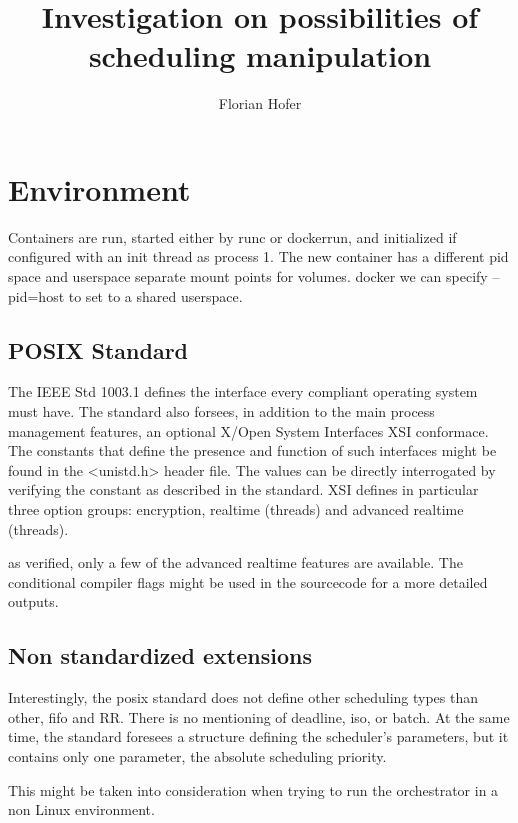 \documentclass[]{scrartcl}
\title{Investigation on possibilities of scheduling manipulation}
\author{Florian Hofer}
\begin{document}
\maketitle

%

\section{Environment}

Containers are run, started either by runc or dockerrun, and initialized if configured with an init thread as process 1. 
The new container has a different pid space and userspace
separate mount points for volumes. docker we can specify --pid=host to set to a shared userspace.

\subsection{POSIX Standard}

The IEEE Std 1003.1 defines the interface every compliant operating system must have. The standard also forsees, in addition to the main process management features, an optional X/Open System Interfaces XSI conformace.
The constants that define the presence and function of such interfaces might be found in the <unistd.h> header file. 
The values can be directly interrogated by verifying the constant as described in the standard.
XSI defines in particular three option groups: encryption, realtime (threads) and advanced realtime (threads). 

as verified, only a few of the advanced realtime features are available. 
The conditional compiler flags might be used in the sourcecode for a more detailed outputs. 

\subsection{Non standardized extensions}

Interestingly, the posix standard does not define other scheduling types than other, fifo and RR. 
There is no mentioning of deadline, iso, or batch. 
At the same time, the standard foresees a structure defining the scheduler's parameters, but it contains only one parameter, the absolute scheduling priority.

This might be taken into consideration when trying to run the orchestrator in a non Linux environment.
\end{document}
